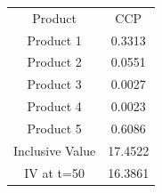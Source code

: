 \begin{tabular}{cc}
Product & CCP \\
Product 1 & 0.3313 \\
Product 2 & 0.0551 \\
Product 3 & 0.0027 \\
Product 4 & 0.0023 \\
Product 5 & 0.6086 \\
Inclusive Value & 17.4522 \\
IV at t=50 & 16.3861 \\
\end{tabular}